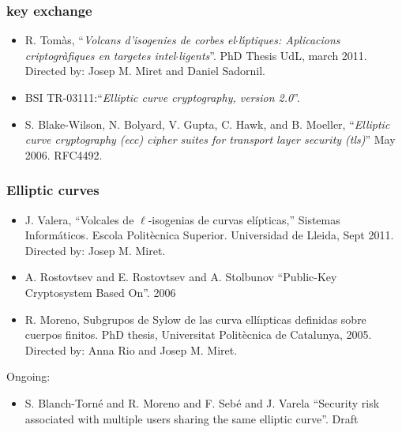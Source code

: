 \documentclass{beamer}
\begin{document}
\begin{frame}
\frametitle{key exchange}
    \begin{itemize}
        \item R. Tom\`as, ``\emph{Volcans d'isogenies de corbes el$\cdot$l\'{\i}ptiques: Aplicacions criptogr\`afiques en targetes intel$\cdot$ligents}''. PhD Thesis UdL, march 2011. Directed by: Josep M. Miret and Daniel Sadornil.\cite{Rosana11}
        \item BSI TR-03111:``\emph{Elliptic curve cryptography, version 2.0}''.\cite{BSI_TR-03111}
        \item S. Blake-Wilson, N. Bolyard, V. Gupta, C. Hawk, and B. Moeller, ``\emph{Elliptic curve cryptography (ecc) cipher suites for transport layer security (tls)}'' May 2006. RFC4492. \cite{rfc4492}
    \end{itemize}
\end{frame}

\begin{frame}
\frametitle{Elliptic curves}
    \begin{itemize}
        \item J. Valera, “Volcales de $\ell$-isogenias de curvas elípticas,” Sistemas Informáticos. Escola Politècnica Superior. Universidad de Lleida, Sept 2011. Directed by: Josep M. Miret. \cite{JValera11}
        \item A. Rostovtsev and E. Rostovtsev and A. Stolbunov ``Public-Key Cryptosystem Based On''. 2006 \cite{Rostovtsev06public}
        \item R. Moreno, Subgrupos de Sylow de las curva ellíıpticas definidas sobre cuerpos finitos. PhD thesis, Universitat Politècnica de Catalunya, 2005. Directed by: Anna Rio and Josep M. Miret. \cite{ramiro05}
    \end{itemize}
    Ongoing:
    \begin{itemize}
        \item S. Blanch-Torn\'e and R. Moreno and F. Seb\'e and J. Varela ``Security risk associated with multiple users sharing the same elliptic curve''. Draft \cite{secRickShareECs}
    \end{itemize}

\end{frame}
\end{document}
